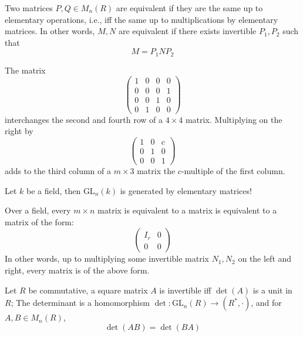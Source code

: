 \documentclass[openany]{book}
\begin{document}
\begin{prop}
    Two matrices $P,Q\in M_{n}(R)$ are equivalent if they are the same up to elementary operations, i.e., iff the same up to multiplications by elementary matrices. In other words, $M,N$ are equivalent if there exists invertible $P_1,P_2$ such that 
    \begin{equation*}
        M=P_1NP_2
    \end{equation*}
\end{prop}
\begin{example}
    The matrix
\[
\begin{pmatrix}
1 & 0 & 0 & 0 \\
0 & 0 & 0 & 1 \\
0 & 0 & 1 & 0 \\
0 & 1 & 0 & 0
\end{pmatrix}
\]
interchanges the second and fourth row of a \(4 \times 4\) matrix. Multiplying on the right by
\[
\begin{pmatrix}
1 & 0 & c \\
0 & 1 & 0 \\
0 & 0 & 1
\end{pmatrix}
\]
adds to the third column of a \(m \times 3\) matrix the \(c\)-multiple of the first column.
\end{example}

\begin{prop}
    Let $k$ be a field, then $\text{GL}_n(k)$ is generated by elementary matrices!
\end{prop}

\begin{prop}
    Over a field, every $m\times n$ matrix is equivalent to a matrix is equivalent to a matrix of the form:
    \[ 
\left( 
\begin{array}{c|c} 
I_r & 0 \\ 
\hline 
0 & 0 
\end{array} 
\right) 
\]
 In other words, up to multiplying some invertible matrix $N_1,N_2$ on the left and right, every matrix is of the above form.
\end{prop}


\begin{prop}
    Let $R$ be commutative, a square matrix $A$ is invertible iff $\det(A)$ is a unit in $R$; The determinant is a homomorphism $\det: \text{GL}_n(R)\to(R^*,\cdot)$, and for $A,B\in M_n(R)$, 
    \begin{equation*}
        \det(AB)=\det(BA)
    \end{equation*}
\end{prop}
\end{document}

